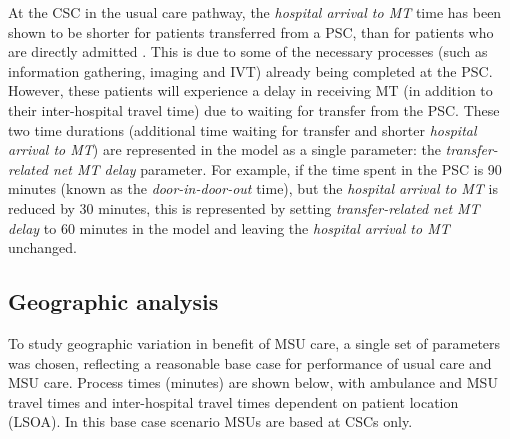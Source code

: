 At the CSC in the usual care pathway, the \emph{hospital arrival to MT} time has been shown to be shorter for patients transferred from a PSC, than for patients who are directly admitted \cite{hassan_impact_2022}. This is due to some of the necessary processes (such as information gathering, imaging and IVT) already being completed at the PSC. However, these patients will experience a delay in receiving MT (in addition to their inter-hospital travel time) due to waiting for transfer from the PSC. These two time durations (additional time waiting for transfer and shorter \emph{hospital arrival to MT}) are represented in the model as a single parameter: the \emph{transfer-related net MT delay} parameter. For example, if the time spent in the PSC is 90 minutes (known as the \textit{door-in-door-out} time), but the \textit{hospital arrival to MT} is reduced by 30 minutes, this is represented by setting \textit{transfer-related net MT delay} to 60 minutes in the model and leaving the \emph{hospital arrival to MT} unchanged.

\subsection{Geographic analysis}

To study geographic variation in benefit of MSU care, a single set of parameters was chosen, reflecting a reasonable base case for performance of usual care and MSU care. Process times (minutes) are shown below, with ambulance and MSU travel times and inter-hospital travel times dependent on patient location (LSOA). In this base case scenario MSUs are based at CSCs only. 

